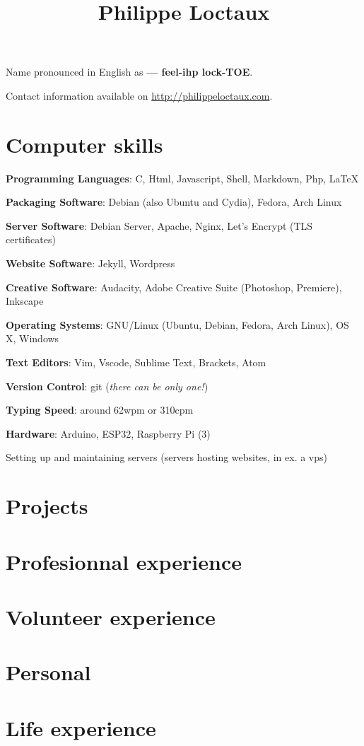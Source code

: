 \documentclass[a4paper]{article}
\title{Philippe Loctaux}
\date{\vspace{-5ex}}
\begin{document}
\maketitle

Name pronounced in English as \textbf{ — feel-ihp lock-TOE}.%

Contact information available on \url{http://philippeloctaux.com}.

\section*{Computer skills}

\begin{description}
	\item \textbf{Programming Languages}: C, Html, Javascript, Shell, Markdown, Php, \LaTeX
	\item \textbf{Packaging Software}: Debian (also Ubuntu and Cydia), Fedora, Arch Linux
	\item \textbf{Server Software}: Debian Server, Apache, Nginx, Let's Encrypt (TLS certificates)
	\item \textbf{Website Software}: Jekyll, Wordpress
	\item \textbf{Creative Software}: Audacity, Adobe Creative Suite (Photoshop, Premiere), Inkscape
	\item \textbf{Operating Systems}: GNU/Linux (Ubuntu, Debian, Fedora, Arch Linux), OS X, Windows
	\item \textbf{Text Editors}: Vim, Vscode, Sublime Text, Brackets, Atom
	\item \textbf{Version Control}: git (\textit{there can be only one!})
	\item \textbf{Typing Speed}: around 62wpm or 310cpm
	\item \textbf{Hardware}: Arduino, ESP32, Raspberry Pi (3)
	\item Setting up and maintaining servers (servers hosting websites, in ex. a vps)
\end{description}

\section*{Projects}
\section*{Profesionnal experience}
\section*{Volunteer experience}
\section*{Personal}
\section*{Life experience}
\end{document}
